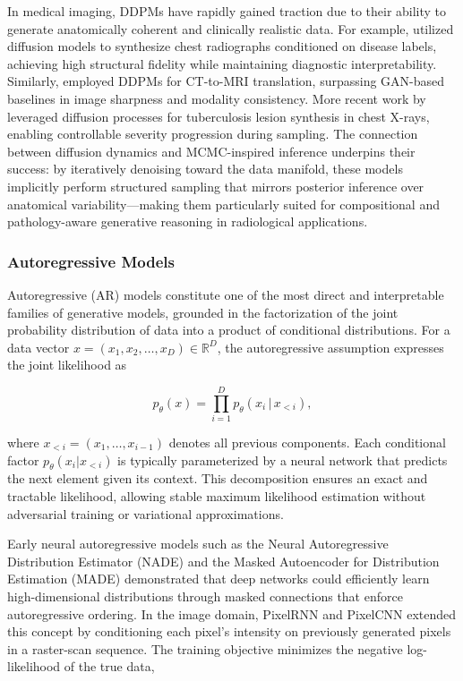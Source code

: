 \vspace{1em}

In medical imaging, DDPMs have rapidly gained traction due to their ability to generate anatomically coherent and clinically realistic data. For example, \cite{kaur2023ddpm_xray} utilized diffusion models to synthesize chest radiographs conditioned on disease labels, achieving high structural fidelity while maintaining diagnostic interpretability. Similarly, \cite{dorj2023ddpm_ct} employed DDPMs for CT-to-MRI translation, surpassing GAN-based baselines in image sharpness and modality consistency. More recent work by \cite{kim2024ddpm_tb} leveraged diffusion processes for tuberculosis lesion synthesis in chest X-rays, enabling controllable severity progression during sampling. The connection between diffusion dynamics and MCMC-inspired inference underpins their success: by iteratively denoising toward the data manifold, these models implicitly perform structured sampling that mirrors posterior inference over anatomical variability—making them particularly suited for compositional and pathology-aware generative reasoning in radiological applications.  



\subsubsection{Autoregressive Models}
Autoregressive (AR) models constitute one of the most direct and interpretable families of generative models, grounded in the factorization of the joint probability distribution of data into a product of conditional distributions. For a data vector \( x = (x_1, x_2, \ldots, x_D) \in \mathbb{R}^D \), the autoregressive assumption expresses the joint likelihood as  

\begin{equation}
    p_\theta(x) = \prod_{i=1}^{D} p_\theta(x_i \,|\, x_{<i}),
\end{equation}

where \( x_{<i} = (x_1, \ldots, x_{i-1}) \) denotes all previous components. Each conditional factor \( p_\theta(x_i | x_{<i}) \) is typically parameterized by a neural network that predicts the next element given its context. This decomposition ensures an exact and tractable likelihood, allowing stable maximum likelihood estimation without adversarial training or variational approximations.  

\vspace{1em}

Early neural autoregressive models such as the Neural Autoregressive Distribution Estimator (NADE) \cite{larochelle2011nade} and the Masked Autoencoder for Distribution Estimation (MADE) \cite{germain2015made} demonstrated that deep networks could efficiently learn high-dimensional distributions through masked connections that enforce autoregressive ordering. In the image domain, PixelRNN and PixelCNN \cite{oord2016pixelrnn, oord2016pixelcnn} extended this concept by conditioning each pixel’s intensity on previously generated pixels in a raster-scan sequence. The training objective minimizes the negative log-likelihood of the true data,  

